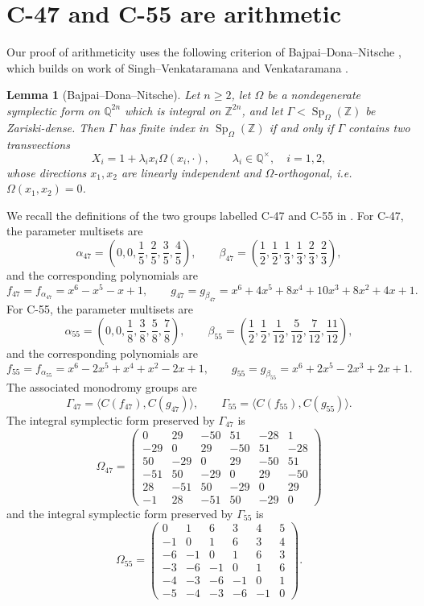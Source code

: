 \documentclass[11pt]{article}
\newtheorem{lemma}{Lemma}
\DeclareMathOperator{\Sp}{Sp}
\newcommand{\ZZ}{\mathbb{Z}}
\newcommand{\QQ}{\mathbb{Q}}
\begin{document}
\section{C-47 and C-55 are arithmetic}

Our proof of arithmeticity uses the following criterion of Bajpai--Dona--Nitsche
\cite[Lemma 1]{BajpaiDonaNitsche2026Arithmetic}, which builds on work of
Singh--Venkataramana \cite{SinghVenkataramana2014Arithmeticity} and
Venkataramana \cite{Venkataramana1987Zariskidensesubgroups}.

\begin{lemma}[Bajpai--Dona--Nitsche]\label{lem:bdn}
    Let $n\geq 2$, let $\Omega$ be a nondegenerate symplectic form on $\QQ^{2n}$
    which is integral on $\ZZ^{2n}$, and let $\Gamma<\Sp_{\Omega}(\ZZ)$ be Zariski-dense. 
    Then $\Gamma$ has finite index in $\Sp_{\Omega}(\ZZ)$ if and only if $\Gamma$ contains two transvections
    \[
      X_i=1+\lambda_i x_i\Omega(x_i,\cdot),\qquad
      \lambda_i\in\QQ^\times,\quad i=1,2,
    \]
    whose directions $x_1,x_2$ are linearly independent and
    $\Omega$-orthogonal, i.e.\ $\Omega(x_1,x_2)=0$.
\end{lemma}

We recall the definitions of the two groups labelled C-47 and C-55 in \cite[Table 3]{BajpaiDonaNitsche2025Thin}. 
For
C-47, the parameter multisets are
\[
  \alpha_{47}= \left(0,0,\frac{1}{5},\frac{2}{5},\frac{3}{5},\frac{4}{5} \right),\qquad
  \beta_{47} = \left( \frac{1}{2},\frac{1}{2},\frac{1}{3},\frac{1}{3},\frac{2}{3},\frac{2}{3} \right),
\]
and the corresponding polynomials are
\[
  f_{47}=f_{\alpha_{47}}=x^6-x^5-x+1,\qquad
  g_{47}=g_{\beta_{47}}=x^6+4x^5+8x^4+10x^3+8x^2+4x+1.
\]
For C-55, the parameter multisets are
\[
  \alpha_{55}=\left(0,0, \frac{1}{8},\frac{3}{8},\frac{5}{8},\frac{7}{8} \right),\qquad
  \beta_{55}= \left(\frac{1}{2},\frac{1}{2},\frac{1}{12},\frac{5}{12},\frac{7}{12},\frac{11}{12}\right),
\]
and the corresponding polynomials are
\[
  f_{55}=f_{\alpha_{55}}=x^6-2x^5+x^4+x^2-2x+1,\qquad
  g_{55}=g_{\beta_{55}}=x^6+2x^5-2x^3+2x+1.
\]
The associated monodromy groups are 
\[
  \Gamma_{47}=\langle C(f_{47}),C(g_{47})\rangle,\qquad
  \Gamma_{55}=\langle C(f_{55}),C(g_{55})\rangle.
\]
The integral symplectic form preserved by $\Gamma_{47}$ is
\[
\Omega_{47}=\begin{pmatrix}
0&29&-50&51&-28&1\\
-29&0&29&-50&51&-28\\
50&-29&0&29&-50&51\\
-51&50&-29&0&29&-50\\
28&-51&50&-29&0&29\\
-1&28&-51&50&-29&0
\end{pmatrix}
\]
and the integral symplectic form preserved by $\Gamma_{55}$ is
\[
\Omega_{55}=\begin{pmatrix}
0&1&6&3&4&5\\
-1&0&1&6&3&4\\
-6&-1&0&1&6&3\\
-3&-6&-1&0&1&6\\
-4&-3&-6&-1&0&1\\
-5&-4&-3&-6&-1&0
\end{pmatrix}.
\]
\end{document}
